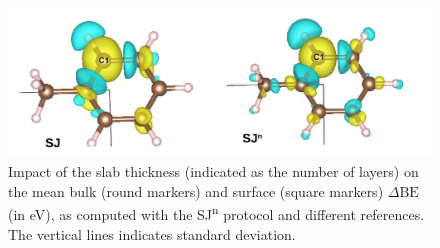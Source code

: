\documentclass[journal=jpccck,manuscript=article]{achemso}
\def\dbe{\ensuremath{\Delta\text{BE}}}
\begin{document}
\begin{figure}[!h]
\centering
\includegraphics[width=\linewidth]{FigureS4}
\caption{Impact of the slab thickness (indicated as the number of layers) on the mean bulk (round markers)  and surface (square markers) \dbe{} (in \si{\electronvolt}), as computed with the SJ\textsuperscript{n} protocol and different references. The vertical lines indicates standard deviation.}
\label{fig:slabsthicknessSJn}
\end{figure}
\end{document}
